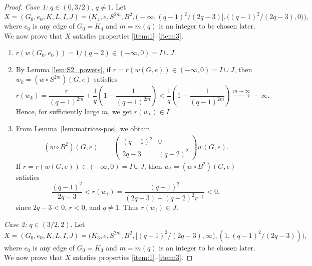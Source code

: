 \documentclass[10pt,a4paper]{amsart}
\newcommand{\of}[1]{\left( #1 \right)}
\begin{document}
\begin{proof}
\emph{Case 1:} $q\in (0,3/2)$, $q\ne 1$. Let \[X =(G_0,e_0,K,L,I,J)=
\Big(K_4,e,S^{2m},B^2, \big(- \infty, (q-1)^2 / (2q-3)\big], \big((q-1)^2 / (2q-3),0\big)\Big),\]
where $e_0$ is any edge of $G_0=K_4$ and $m=m(q)$ is an integer to be chosen later.
We now prove that $X$ satisfies properties \eqref{item:1}--\eqref{item:3}.
\begin{enumerate}
    \item $r(w(G_0,e_0)) = 1/(q-2)\in (-\infty,0)=I \cup J$.
    \item By Lemma \ref{lem:S2_powers}, if $r = r(w(G,e)) \in (-\infty,0) = I \cup J$, then $w_k = (w \circ S^{2m})(G,e)$ satisfies
    \begin{equation*}
        r(w_k) = \frac{r}{(q-1)^{2m}} + \frac{1}{q} \of{1 - \frac{1}{(q-1)^{2m}}} < \frac{1}{q} \of{1 - \frac{1}{(q-1)^{2m}}} \overset{m \to \infty}{\longrightarrow} - \infty.
    \end{equation*}
       Hence, for sufficiently large $m$, we get $r(w_k) \in I$.  
    \item From Lemma~\ref{lem:matrices-pos}, we obtain
    \begin{align}\label{eq:B2_matrix}
        (w \circ B^2)(G,e) &= \begin{pmatrix}
            (q-1)^2 & 0 \\
            2q-3 & (q-2)^2 
        \end{pmatrix}
        w(G,e).
    \end{align}
    If $r = r(w(G,e)) \in (-\infty,0) = I \cup J$, then $w_\ell = (w \circ B^2)(G,e)$ satisfies 
    \begin{equation*}
        \frac{(q-1)^2}{2q-3}< r(w_\ell) = \frac{(q-1)^2}{(2q-3) + (q-2)^2 r^{-1}} < 0,
    \end{equation*}
    since $2q - 3 < 0$, $r<0$, and $q \neq 1$. Thus $r(w_\ell) \in J$.
\end{enumerate}
    

\emph{Case 2:} $q \in (3/2, 2)$. Let \[X =(G_0,e_0,K,L,I,J)=
\Big(K_3,e,S^{2m},B^2,  \big[(q-1)^2 / (2q-3),\infty\big), (1,(q-1)^2 / (2q-3))\Big),\]
where $e_0$ is any edge of $G_0=K_3$ and $m=m(q)$ is an integer to be chosen later.
We now prove that $X$ satisfies properties \eqref{item:1}--\eqref{item:3}.


\end{proof}
\end{document}
